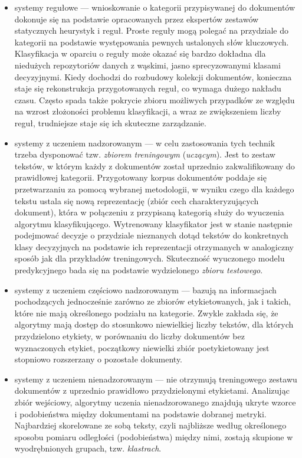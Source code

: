 \documentclass{pracamgr}
\begin{document}
\begin{itemize}
    \item systemy regułowe --- wnioskowanie o kategorii przypisywanej do dokumentów dokonuje się na podstawie opracowanych przez ekspertów zestawów statycznych heurystyk i reguł. Proste reguły mogą polegać na przydziale do kategorii na podstawie występowania pewnych ustalonych słów kluczowych. Klasyfikacja w oparciu o reguły może okazać się bardzo dokładna dla niedużych repozytoriów danych z wąskimi, jasno sprecyzowanymi klasami decyzyjnymi. Kiedy dochodzi do rozbudowy kolekcji dokumentów, konieczna staje się rekonstrukcja przygotowanych reguł, co wymaga dużego nakładu czasu. Często spada także pokrycie zbioru możliwych przypadków ze względu na wzrost złożoności problemu klasyfikacji, a wraz ze zwiększeniem liczby reguł, trudniejsze staje się ich skuteczne zarządzanie.
    \item systemy z uczeniem nadzorowanym --- w celu zastosowania tych technik trzeba dysponować tzw. \textit{zbiorem treningowym} (\textit{uczącym}). Jest to zestaw tekstów, w którym każdy z dokumentów został uprzednio zakwalifikowany do prawidłowej kategorii. Przygotowany korpus dokumentów poddaje się przetwarzaniu za pomocą wybranej metodologii, w wyniku czego dla każdego tekstu ustala się nową reprezentację (zbiór cech charakteryzujących dokument), która w połączeniu z przypisaną kategorią służy do wyuczenia algorytmu klasyfikującego. Wytrenowany klasyfikator jest w stanie następnie podejmować decyzje o przydziale nieznanych dotąd tekstów do konkretnych klasy decyzyjnych na podstawie ich reprezentacji otrzymanych w analogiczny sposób jak dla przykładów treningowych. Skuteczność wyuczonego modelu predykcyjnego bada się na podstawie wydzielonego \textit{zbioru testowego}.
    \item systemy z uczeniem częściowo nadzorowanym --- bazują na informacjach pochodzących jednocześnie zarówno ze zbiorów etykietowanych, jak i takich, które nie mają określonego podziału na kategorie. Zwykle zakłada się, że algorytmy mają dostęp do stosunkowo niewielkiej liczby tekstów, dla których przydzielono etykiety, w porównaniu do liczby dokumentów bez wyznaczonych etykiet, początkowy niewielki zbiór poetykietowany jest stopniowo rozszerzany o pozostałe dokumenty.
    \item systemy z uczeniem nienadzorowanym --- nie otrzymują treningowego zestawu dokumentów z uprzednio prawidłowo przydzielonymi etykietami. Analizując zbiór wejściowy, algorytmy uczenia nienadzorowanego znajdują ukryte wzorce i podobieństwa między dokumentami na podstawie dobranej metryki. Najbardziej skorelowane ze sobą teksty, czyli najbliższe według określonego sposobu pomiaru odległości (podobieństwa) między nimi, zostają skupione w wyodrębnionych grupach, tzw. \textit{klastrach}.
\end{itemize}
\end{document}
